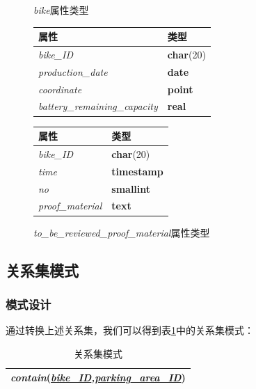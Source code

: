 \begin{figure}[!htp]
    \begin{minipage}{0.5\textwidth}
      \centering

      \caption{\textit{bike}属性类型}
      \label{tab:bike}
      \begin{tabular}{ll}\toprule
        属性&类型\\\midrule
       \textit{bike\_ID}&\textbf{char}(20)\\
       \textit{production\_date}&\textbf{date}\\
       \textit{coordinate}&\textbf{point}\\
       \textit{battery\_remaining\_capacity}&\textbf{real}\\
       \bottomrule
      \end{tabular}

    \end{minipage}\hfill
    \begin{minipage}{0.5\textwidth}
      \centering
      \caption{\textit{to\_be\_reviewed\_proof\_material}属性类型}
      \label{tab:tobereviewedproofmaterial}
      \begin{tabular}{ll}\toprule
        属性&类型\\\midrule
       \textit{bike\_ID}&\textbf{char}(20)\\
       \textit{time}&\textbf{timestamp}\\
       \textit{no}&\textbf{smallint}\\
       \textit{proof\_material}&\textbf{text}\\
       \bottomrule
      \end{tabular}
    \end{minipage}\hfill
  \end{figure}
\subsection{关系集模式}
\subsubsection{模式设计}
  通过转换上述关系集，我们可以得到表\ref{tab:relationschema}中的关系集模式：

  \begin{table}[!hpt]
      \caption{关系集模式}
      \label{tab:relationschema}
      \centering
      \begin{tabular}{l} \toprule
           \textit{contain}(\textit{\underline{bike\_ID},\underline{parking\_area\_ID}})\\
           \bottomrule
      \end{tabular}
    \end{table}

